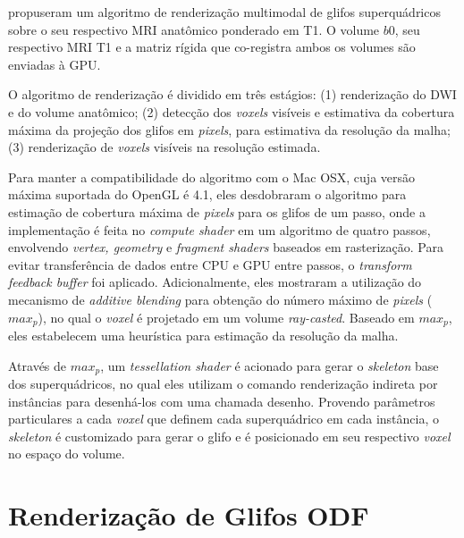  propuseram um algoritmo de renderização multimodal de glifos superquádricos sobre o seu respectivo MRI anatômico ponderado em T1. O volume $b0$, seu respectivo MRI T1 e a matriz rígida que co-registra ambos os volumes \cite{ting2014} são enviadas à GPU.

O algoritmo de renderização é dividido em três estágios: (1) renderização do DWI e do volume anatômico; (2) detecção dos \textit{voxels} visíveis e estimativa da cobertura máxima da projeção dos glifos em \textit{pixels}, para estimativa da resolução da malha; (3) renderização de \textit{voxels} visíveis na resolução estimada.

Para manter a compatibilidade do algoritmo com o Mac OSX, cuja versão máxima suportada do OpenGL é 4.1, eles desdobraram o algoritmo para estimação de cobertura máxima de \textit{pixels} para os glifos de um passo, onde a implementação é feita no \textit{compute shader} em um algoritmo de quatro passos, envolvendo \textit{vertex, geometry} e \textit{fragment shaders} baseados em rasterização. Para evitar transferência de dados entre CPU e GPU entre passos, o \textit{transform feedback buffer} foi aplicado. Adicionalmente, eles mostraram a utilização do mecanismo de \textit{additive blending} para obtenção do número máximo de \textit{pixels} ($max_p$), no qual o \textit{voxel} é projetado em um volume \textit{ray-casted}. Baseado em $max_p$, eles estabelecem uma heurística para estimação da resolução da malha.

Através de $max_p$, um \textit{tessellation shader} é acionado para gerar o \textit{skeleton} base dos superquádricos, no qual eles utilizam o comando renderização indireta por instâncias para desenhá-los com uma chamada desenho. Provendo parâmetros particulares a cada \textit{voxel} que definem cada superquádrico em cada instância, o \textit{skeleton} é customizado para gerar o glifo e é posicionado em seu respectivo \textit{voxel} no espaço do volume.


\section{Renderização de Glifos ODF}
\label{sec::renderizacao_de_glifos_ODF}

